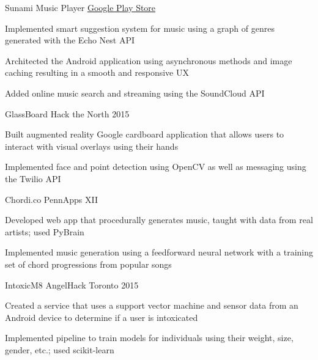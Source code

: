 \begin{cvprojects}
  \cvproject
    {Sunami Music Player}
    {\href{http://play.google.com/store/apps/details?id=com.wojtechnology.sunami}{Google Play Store}}
    {
      \begin{cvitems}
        \item Implemented smart suggestion system for music using a graph of genres generated with the Echo Nest API
        \item Architected the Android application using asynchronous methods and image caching resulting in a smooth and responsive UX
        \item Added online music search and streaming using the SoundCloud API
      \end{cvitems}
    }
  \cvproject
    {GlassBoard}
    {Hack the North 2015}
    {
      \begin{cvitems}
        \item Built augmented reality Google cardboard application that allows users to interact with visual overlays using their hands
        \item Implemented face and point detection using OpenCV as well as messaging using the Twilio API
      \end{cvitems}
    }
  \cvproject
    {Chordi.co}
    {PennApps XII}
    {
      \begin{cvitems}
        \item Developed web app that procedurally generates music, taught with data from real artists; used PyBrain
        \item Implemented music generation using a feedforward neural network with a training set of chord progressions from popular songs
      \end{cvitems}
    }
  \cvproject
    {IntoxicM8}
    {AngelHack Toronto 2015}
    {
      \begin{cvitems}
        \item Created a service that uses a support vector machine and sensor data from an Android device to determine if a user is intoxicated
        \item Implemented pipeline to train models for individuals using their weight, size, gender, etc.; used scikit-learn
      \end{cvitems}
    }
\end{cvprojects}
